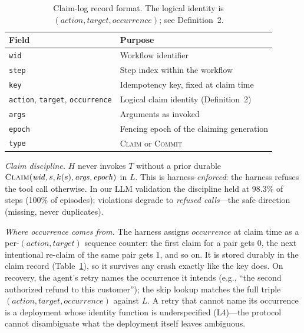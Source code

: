\documentclass[10pt,journal,compsoc]{IEEEtran}
\begin{document}
\begin{table}[ht]
\centering
\caption{Claim-log record format. The logical identity is
$(\mathit{action}, \mathit{target}, \mathit{occurrence})$; see
Definition~2.}
\label{tab:record}
{\small
\begin{tabular}{@{}p{} p{}@{}}
\toprule
Field & Purpose \\
\midrule
\texttt{wid} & Workflow identifier \\
\texttt{step} & Step index within the workflow \\
\texttt{key} & Idempotency key, fixed at claim time \\
\texttt{action}, \texttt{target}, \texttt{occurrence} & Logical claim identity (Definition~2) \\
\texttt{args} & Arguments as invoked \\
\texttt{epoch} & Fencing epoch of the claiming generation \\
\texttt{type} & \textsc{Claim} or \textsc{Commit} \\
\bottomrule
\end{tabular}}
\end{table}

\emph{Claim discipline.} $H$ never invokes $T$ without a prior
durable $\textsc{Claim}(\mathit{wid}, s, k(s), \mathit{args},
\mathit{epoch})$ in $L$. This is harness-\emph{enforced}: the
harness refuses the tool call otherwise. In our LLM validation
the discipline held at 98.3\% of steps (100\% of episodes);
violations degrade to \emph{refused calls}---the safe direction
(missing, never duplicates).

\emph{Where occurrence comes from.} The harness assigns
$\mathit{occurrence}$ at claim time as a per-$(\mathit{action},
\mathit{target})$ sequence counter: the first claim for a pair
gets 0, the next intentional re-claim of the same pair gets 1,
and so on. It is stored durably in the claim record
(Table~\ref{tab:record}), so it survives any crash exactly like
the key does. On recovery, the agent's retry names the
occurrence it intends (e.g., ``the second authorized refund to
this customer''); the skip lookup matches the full triple
$(\mathit{action}, \mathit{target}, \mathit{occurrence})$
against $L$. A retry that cannot name its occurrence is a
deployment whose identity function is underspecified (L4)---the
protocol cannot disambiguate what the deployment itself leaves
ambiguous.
\end{document}
